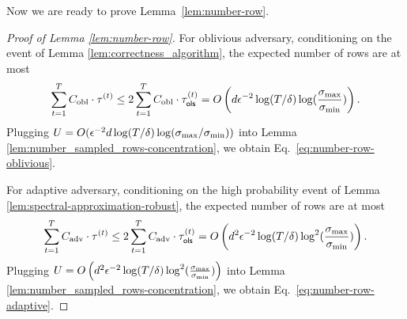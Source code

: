 Now we are ready to prove Lemma~\ref{lem:number-row}.
\begin{proof}[Proof of Lemma \ref{lem:number-row}]
For oblivious adversary, conditioning on the event of Lemma \ref{lem:correctness_algorithm}, the expected number of rows are at most 
\begin{align*}
\sum_{t=1}^{T}C_{\text{obl}}\cdot \tau^{(t)} \leq 2\sum_{t=1}^{T}C_{\text{obl}} \cdot \tau_{\mathsf{ols}}^{(t)} = O\left(d\epsilon^{-2}\log(T/\delta)\log(\frac{\sigma_{\max}}{\sigma_{\min}})\right).
\end{align*}
Plugging $U = O(\epsilon^{-2}d\log(T/\delta)\log(\sigma_{\max} / \sigma_{\min}))$ into Lemma \ref{lem:number_sampled_rows-concentration}, we obtain Eq.~\eqref{eq:number-row-oblivious}.

For adaptive adversary, conditioning on the high probability event of Lemma \ref{lem:spectral-approximation-robust}, the expected number of rows are at most 
\begin{align*}
\sum_{t=1}^{T}C_{\text{adv}}\cdot \tau^{(t)} \leq 2\sum_{t=1}^{T}C_{\text{adv}} \cdot \tau_{\mathsf{ols}}^{(t)} = O\left(d^2\epsilon^{-2}\log(T/\delta)\log^2(\frac{\sigma_{\max}}{\sigma_{\min}})\right).
\end{align*}
Plugging $U = O\left(d^2\epsilon^{-2}\log(T/\delta)\log^2(\frac{\sigma_{\max}}{\sigma_{\min}})\right)$ into Lemma \ref{lem:number_sampled_rows-concentration}, we obtain Eq.~\eqref{eq:number-row-adaptive}.
\end{proof}
